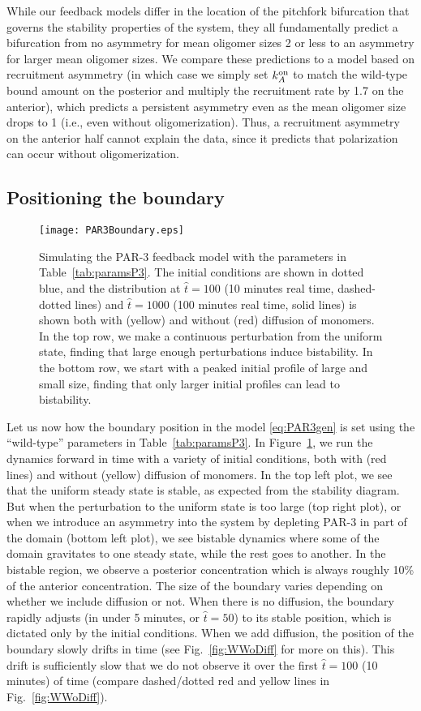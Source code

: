 \documentclass[11pt]{article}
\newcommand{\6}[1]{#1_{\text{6}}}
\newcommand{\3}[1]{#1_{\text{3}}}
\begin{document}
While our feedback models differ in the location of the pitchfork bifurcation that governs the stability properties of the system, they all fundamentally predict a bifurcation from no asymmetry for mean oligomer sizes 2 or less to an asymmetry for larger mean oligomer sizes. We compare these predictions to a model based on recruitment asymmetry (in which case we simply set $k^\text{on}_A$ to match the wild-type bound amount on the posterior and multiply the recruitment rate by 1.7 on the anterior), which predicts a persistent asymmetry even as the mean oligomer size drops to 1 (i.e., even without oligomerization). Thus, a recruitment asymmetry on the anterior half cannot explain the data, since it predicts that polarization can occur without oligomerization. 

\subsection{Positioning the boundary}
\begin{figure}
\centering
\texttt{[image: PAR3Boundary.eps]}
\caption{\label{fig:P3FBBd}Simulating the PAR-3 feedback model with the parameters in Table\ \ref{tab:paramsP3}. The initial conditions are shown in dotted blue, and the distribution at $\hat t = 100$ (10 minutes real time, dashed-dotted lines) and $\hat t = 1000$ (100 minutes real time, solid lines) is shown both with (yellow) and without (red) diffusion of monomers. In the top row, we make a continuous perturbation from the uniform state, finding that large enough perturbations induce bistability. In the bottom row, we start with a peaked initial profile of large and small size, finding that only larger initial profiles can lead to bistability. }
\end{figure}

Let us now how the boundary position in the model \eqref{eq:PAR3gen} is set using the ``wild-type'' parameters in Table\ \ref{tab:paramsP3}. In Figure\ \ref{fig:P3FBBd}, we run the dynamics forward in time with a variety of initial conditions, both with (red lines) and without (yellow) diffusion of monomers. In the top left plot, we see that the uniform steady state is stable, as expected from the stability diagram. But when the perturbation to the uniform state is too large (top right plot), or when we introduce an asymmetry into the system by depleting PAR-3 in part of the domain (bottom left plot), we see bistable dynamics where some of the domain gravitates to one steady state, while the rest goes to another. In the bistable region, we observe a posterior concentration which is always roughly 10\% of the anterior concentration. The size of the boundary varies depending on whether we include diffusion or not. When there is no diffusion, the boundary rapidly adjusts (in under 5 minutes, or $\hat t = 50$) to its stable position, which is dictated only by the initial conditions. When we add diffusion, the position of the boundary slowly drifts in time (see Fig.\ \ref{fig:WWoDiff} for more on this). This drift is sufficiently slow that we do not observe it over the first $\hat t =100$ (10 minutes) of time (compare dashed/dotted red and yellow lines in Fig.\ \ref{fig:WWoDiff}).
\end{document}
